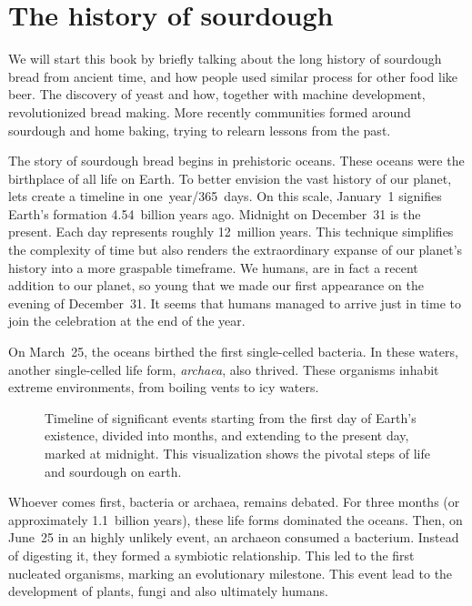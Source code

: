 \chapter{The history of sourdough}%
\label{ch:history}
\begin{quoting}
    We will start this book by briefly talking about the long history of
    sourdough bread from ancient time, and how people used similar process for
    other food like beer. The discovery of yeast and how, together with
    machine development, revolutionized bread making.  More recently
    communities formed around sourdough and home baking, trying to relearn
    lessons from the past.
\end{quoting}

The story of sourdough bread begins in prehistoric oceans. These oceans were the
birthplace of all life on Earth. To better envision the vast history of
our planet, lets create a timeline in one~year/365~days. On this scale,
January~1 signifies Earth's
formation 4.54~billion years ago. Midnight on December~31 is the present.
Each day represents roughly 12~million years. This technique simplifies the
complexity of time but also renders the extraordinary expanse of our planet's
history into a more graspable timeframe. We humans, are in fact a recent
addition to our planet, so young that we made our first appearance on
the evening of December~31.  It seems that humans managed to arrive just
in time to join the celebration at the end of the year.

On March~25, the oceans birthed the first single-celled bacteria. In these
waters, another single-celled life form, \emph{archaea}, also thrived. These
organisms inhabit extreme environments, from boiling vents to icy waters.

\begin{figure}[!htb]
\begin{center}
  
  \caption[Sourdough microbiology timeline]{Timeline of significant events
    starting from the first day of Earth's existence,
    divided into months, and extending to the present day,
    marked at midnight. This visualization shows the pivotal steps
    of life and sourdough on earth.}%
\end{center}
\end{figure}

Whoever comes first, bacteria or archaea, remains debated. For three
months (or approximately 1.1~billion years), these life forms dominated
the oceans. Then, on June~25 in an highly unlikely event, an archaeon consumed a bacterium.
Instead of digesting it, they formed a symbiotic relationship. This led to the
first nucleated organisms, marking an evolutionary milestone. This event lead
to the development of plants, fungi and also ultimately humans.

